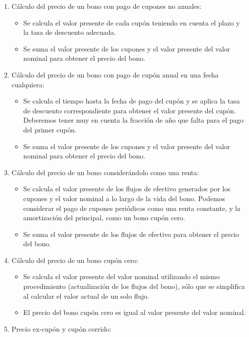 \documentclass[
  letterpaper,
  DIV=11,
  numbers=noendperiod]{scrartcl}
\begin{document}
\begin{enumerate}
\def\labelenumi{\arabic{enumi}.}
\item
  Cálculo del precio de un bono con pago de cupones no anuales:

  \begin{itemize}
  \item
    Se calcula el valor presente de cada cupón teniendo en cuenta el
    plazo y la tasa de descuento adecuada.
  \item
    Se suma el valor presente de los cupones y el valor presente del
    valor nominal para obtener el precio del bono.
  \end{itemize}
\item
  Cálculo del precio de un bono con pago de cupón anual en una fecha
  cualquiera:

  \begin{itemize}
  \item
    Se calcula el tiempo hasta la fecha de pago del cupón y se aplica la
    tasa de descuento correspondiente para obtener el valor presente del
    cupón. Deberemos tener muy en cuenta la fracción de año que falta
    para el pago del primer cupón.
  \item
    Se suma el valor presente de los cupones y el valor presente del
    valor nominal para obtener el precio del bono.
  \end{itemize}
\item
  Cálculo del precio de un bono considerándolo como una renta:

  \begin{itemize}
  \item
    Se calcula el valor presente de los flujos de efectivo generados por
    los cupones y el valor nominal a lo largo de la vida del bono.
    Podemos considerar el pago de cupones periódicos como una renta
    constante, y la amortización del principal, como un bono cupón cero.
  \item
    Se suma el valor presente de los flujos de efectivo para obtener el
    precio del bono.
  \end{itemize}
\item
  Cálculo del precio de un bono cupón cero:

  \begin{itemize}
  \item
    Se calcula el valor presente del valor nominal utilizando el mismo
    procedimiento (actualización de los flujos del bono), sólo que se
    simplifica al calcular el valor actual de un solo flujo.
  \item
    El precio del bono cupón cero es igual al valor presente del valor
    nominal.
  \end{itemize}
\item
  Precio ex-cupón y cupón corrido:


\end{enumerate}
\end{document}
